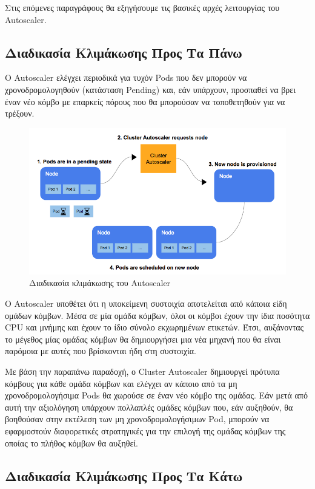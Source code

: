 Στις επόμενες παραγράφους θα εξηγήσουμε τις βασικές αρχές λειτουργίας του
Autoscaler.

\subsection{Διαδικασία Κλιμάκωσης Προς Τα Πάνω}
Ο Autoscaler ελέγχει περιοδικά για τυχόν Pods που δεν μπορούν να
χρονοδρομολογηθούν (κατάσταση Pending) και, εάν υπάρχουν, προσπαθεί να βρει έναν
νέο κόμβο με επαρκείς πόρους που θα μπορούσαν να τοποθετηθούν για να τρέξουν.

\begin{figure}[ht]
      \centering
      \includegraphics[width=\textwidth]{resources/autoscaler-scale-up.png}
      \caption{Διαδικασία κλιμάκωσης του Autoscaler}
\end{figure}

Ο Autoscaler υποθέτει ότι η υποκείμενη συστοιχία αποτελείται από κάποια είδη
ομάδων κόμβων. Μέσα σε μία ομάδα κόμβων, όλοι οι κόμβοι έχουν την ίδια ποσότητα
CPU και μνήμης και έχουν το ίδιο σύνολο εκχωρημένων ετικετών. Έτσι, αυξάνοντας
το μέγεθος μίας ομάδας κόμβων θα δημιουργήσει μια νέα μηχανή που θα είναι
παρόμοια με αυτές που βρίσκονται ήδη στη συστοιχία.

Με βάση την παραπάνω παραδοχή, ο Cluster Autoscaler δημιουργεί πρότυπα κόμβους
για κάθε ομάδα κόμβων και ελέγχει αν κάποιο από τα μη χρονοδρομολογήσιμα
Pods θα χωρούσε σε έναν νέο κόμβο της ομάδας. Εάν μετά από αυτή την αξιολόγηση
υπάρχουν πολλαπλές ομάδες κόμβων που, εάν αυξηθούν, θα βοηθούσαν στην εκτέλεση
των μη χρονοδρομολογήσιμων Pod, μπορούν να εφαρμοστούν διαφορετικές στρατηγικές
για την επιλογή της ομάδας κόμβων της οποίας το πλήθος κόμβων θα αυξηθεί.

\subsection{Διαδικασία Κλιμάκωσης Προς Τα Κάτω}

